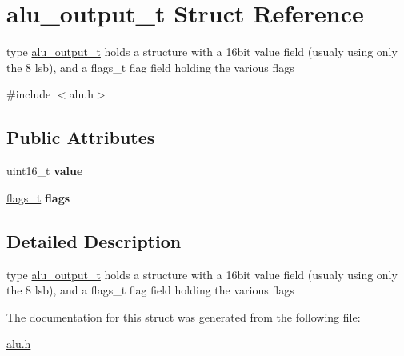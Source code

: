 \hypertarget{structalu__output__t}{}\section{alu\+\_\+output\+\_\+t Struct Reference}
\label{structalu__output__t}


type \hyperlink{structalu__output__t}{alu\+\_\+output\+\_\+t} holds a structure with a 16bit value field (usualy using only the 8 lsb), and a flags\+\_\+t flag field holding the various flags  




{\ttfamily \#include $<$alu.\+h$>$}

\subsection*{Public Attributes}
\begin{DoxyCompactItemize}
\item 
\mbox{\label{structalu__output__t_a10070ee149017adacadd33f7b56a2617}} 
uint16\+\_\+t {\bfseries value}
\item 
\mbox{\label{structalu__output__t_a0811fcb1c1aa53b0ec602292bbeddea2}} 
\hyperlink{alu_8h_abadb4591ed8f9b06ae6b6a53337ce19e}{flags\+\_\+t} {\bfseries flags}
\end{DoxyCompactItemize}


\subsection{Detailed Description}
type \hyperlink{structalu__output__t}{alu\+\_\+output\+\_\+t} holds a structure with a 16bit value field (usualy using only the 8 lsb), and a flags\+\_\+t flag field holding the various flags 

The documentation for this struct was generated from the following file\+:\begin{DoxyCompactItemize}
\item 
\hyperlink{alu_8h}{alu.\+h}\end{DoxyCompactItemize}
